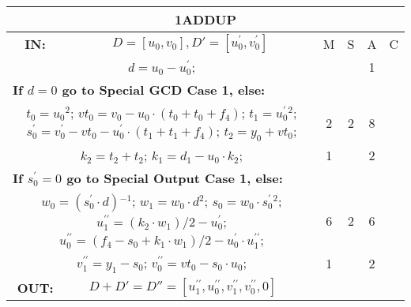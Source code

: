 \begin{tabular}{|c|cr|c|c|c|c|}
\hline
\multicolumn{7}{|c|}{\bf{1ADDUP}} \TS \\
\hline
\bf{IN:} &\multicolumn{2}{|c|}{$D = [u_0,v_0], D' = [u^{\prime}_0,v^{\prime}_0]$}
\TS & M & \hspace{1pt}S\hspace{1pt} & A & \hspace{1pt}C\hspace{1pt} \\
\hline
\multicolumn{3}{|R{340pt}|}{ 
$d=u_0-u^{\prime}_0$;\hspace{4pt}
} &  &  & 1 & \\
\multicolumn{3}{|l|}{ 
 \bf{If $d = 0$ go to Special GCD Case 1, else:} } &  &  &  & \\
\multicolumn{3}{|R{340pt}|}{ 
$t_0=u_0{}^{2}$;\hspace{4pt}
$vt_0=v_0-u_0 \cdot (t_0+t_0+f_4)$;\hspace{4pt}
$t_1=u^{\prime}_0{}^{2}$;\hspace{4pt}
$s^{\prime}_0=v^{\prime}_0-vt_0-u^{\prime}_0 \cdot (t_1+t_1+f_4)$;\hspace{4pt}
$t_2=y_0+vt_0$;\hspace{4pt}
} & 2 & 2 & 8 & \\
\multicolumn{3}{|R{340pt}|}{ 
$k_2=t_2+t_2$;\hspace{4pt}
$k_1=d_1-u_0 \cdot k_2$;\hspace{4pt}
} & 1 &  & 2 & \\
\multicolumn{3}{|l|}{ 
 \bf{If $s^{\prime}_0 = 0$ go to Special Output Case 1, else:} } &  &  &  & \\
\multicolumn{3}{|R{340pt}|}{ 
$w_0=(s^{\prime}_0 \cdot d){}^{-1}$;\hspace{4pt}
$w_1=w_0 \cdot d{}^{2}$;\hspace{4pt}
$s_0=w_0 \cdot s^{\prime}_0{}^{2}$;\hspace{4pt}
$u^{\prime\prime}_1=(k_2 \cdot w_1)/2-u^{\prime}_0$;\hspace{4pt}
$u^{\prime\prime}_0=(f_4-s_0+k_1 \cdot w_1)/2-u^{\prime}_0 \cdot u^{\prime\prime}_1$;\hspace{4pt}
} & 6 & 2 & 6 & \\
\multicolumn{3}{|R{340pt}|}{ 
$v^{\prime\prime}_1=y_1-s_0$;\hspace{4pt}
$v^{\prime\prime}_0=vt_0-s_0 \cdot u_0$;\hspace{4pt}
} & 1 &  & 2 & \\
\hline
\bf{OUT:} & \hspace*{65pt} $D + D' = D'' = [u^{\prime\prime}_1,u^{\prime\prime}_0,v^{\prime\prime}_1,v^{\prime\prime}_0,0]$

\end{tabular}
